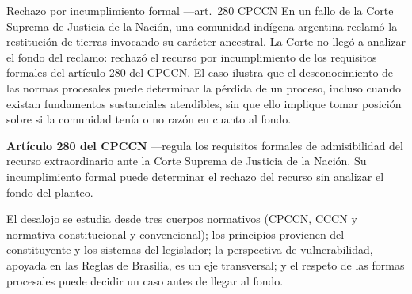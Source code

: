 \documentclass[12pt,oneside]{book}
\begin{document}
\begin{example}{Rechazo por incumplimiento formal ---art.\ 280 CPCCN}
En un fallo de la Corte Suprema de Justicia de la Nación, una comunidad indígena argentina reclamó la restitución de tierras invocando su carácter ancestral. La Corte no llegó a analizar el fondo del reclamo: rechazó el recurso por incumplimiento de los requisitos formales del artículo 280 del CPCCN. El caso ilustra que el desconocimiento de las normas procesales puede determinar la pérdida de un proceso, incluso cuando existan fundamentos sustanciales atendibles, sin que ello implique tomar posición sobre si la comunidad tenía o no razón en cuanto al fondo.
\end{example}

\begin{normacitada}
\textbf{Artículo 280 del CPCCN} ---regula los requisitos formales de admisibilidad del recurso extraordinario ante la Corte Suprema de Justicia de la Nación. Su incumplimiento formal puede determinar el rechazo del recurso sin analizar el fondo del planteo.
\end{normacitada}

\begin{sintesis}
El desalojo se estudia desde tres cuerpos normativos (CPCCN, CCCN y normativa constitucional y convencional); los principios provienen del constituyente y los sistemas del legislador; la perspectiva de vulnerabilidad, apoyada en las Reglas de Brasilia, es un eje transversal; y el respeto de las formas procesales puede decidir un caso antes de llegar al fondo.
\end{sintesis}
\end{document}
